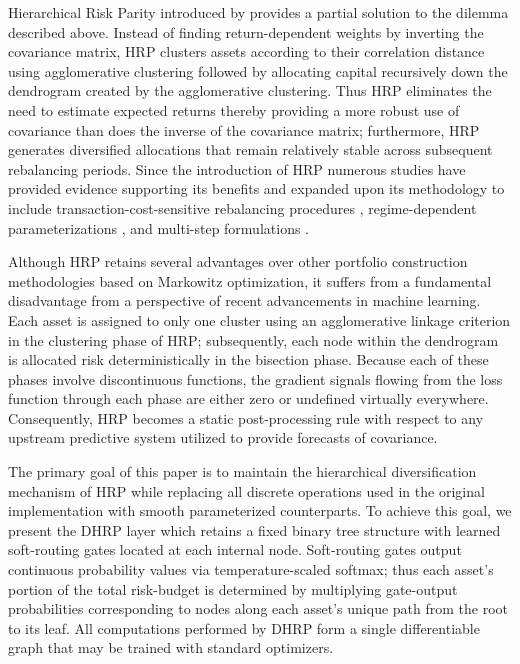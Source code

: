\documentclass{article}
\begin{document}
Hierarchical Risk Parity introduced by \citet{LopezdePrado2016} provides a partial solution to the dilemma described above. Instead of finding return-dependent weights by inverting the covariance matrix, HRP clusters assets according to their correlation distance using agglomerative clustering followed by allocating capital recursively down the dendrogram created by the agglomerative clustering. Thus HRP eliminates the need to estimate expected returns thereby providing a more robust use of covariance than does the inverse of the covariance matrix; furthermore, HRP generates diversified allocations that remain relatively stable across subsequent rebalancing periods. Since the introduction of HRP numerous studies have provided evidence supporting its benefits and expanded upon its methodology to include transaction-cost-sensitive rebalancing procedures \citep{Roncalli2013}, regime-dependent parameterizations \citep{Raffinot2018}, and multi-step formulations \citep{Roncalli2013}.

Although HRP retains several advantages over other portfolio construction methodologies based on Markowitz optimization, it suffers from a fundamental disadvantage from a perspective of recent advancements in machine learning. Each asset is assigned to only one cluster using an agglomerative linkage criterion in the clustering phase of HRP; subsequently, each node within the dendrogram is allocated risk deterministically in the bisection phase. Because each of these phases involve discontinuous functions, the gradient signals flowing from the loss function through each phase are either zero or undefined virtually everywhere. Consequently, HRP becomes a static post-processing rule with respect to any upstream predictive system utilized to provide forecasts of covariance.

The primary goal of this paper is to maintain the hierarchical diversification mechanism of HRP while replacing all discrete operations used in the original implementation with smooth parameterized counterparts. To achieve this goal, we present the DHRP layer which retains a fixed binary tree structure with learned soft-routing gates located at each internal node. Soft-routing gates output continuous probability values via temperature-scaled softmax; thus each asset's portion of the total risk-budget is determined by multiplying gate-output probabilities corresponding to nodes along each asset's unique path from the root to its leaf. All computations performed by DHRP form a single differentiable graph that may be trained with standard optimizers.
\end{document}

